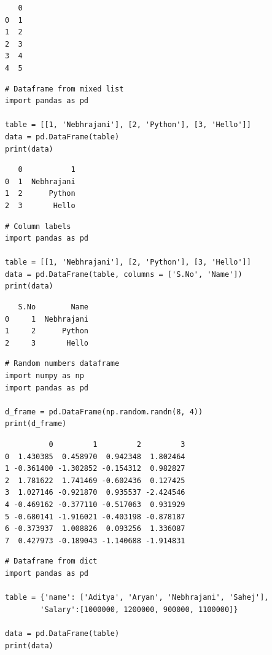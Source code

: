 \documentclass[11pt]{article}
\begin{document}
\begin{verbatim}
   0
0  1
1  2
2  3
3  4
4  5
\end{verbatim}


\begin{verbatim}
# Dataframe from mixed list
import pandas as pd

table = [[1, 'Nebhrajani'], [2, 'Python'], [3, 'Hello']]
data = pd.DataFrame(table)
print(data)
\end{verbatim}

\begin{verbatim}
   0           1
0  1  Nebhrajani
1  2      Python
2  3       Hello
\end{verbatim}


\begin{verbatim}
# Column labels
import pandas as pd

table = [[1, 'Nebhrajani'], [2, 'Python'], [3, 'Hello']]
data = pd.DataFrame(table, columns = ['S.No', 'Name'])
print(data)
\end{verbatim}

\begin{verbatim}
   S.No        Name
0     1  Nebhrajani
1     2      Python
2     3       Hello
\end{verbatim}


\begin{verbatim}
# Random numbers dataframe
import numpy as np
import pandas as pd

d_frame = pd.DataFrame(np.random.randn(8, 4))
print(d_frame)
\end{verbatim}

\begin{verbatim}
          0         1         2         3
0  1.430385  0.458970  0.942348  1.802464
1 -0.361400 -1.302852 -0.154312  0.982827
2  1.781622  1.741469 -0.602436  0.127425
3  1.027146 -0.921870  0.935537 -2.424546
4 -0.469162 -0.377110 -0.517063  0.931929
5 -0.680141 -1.916021 -0.403198 -0.878187
6 -0.373937  1.008826  0.093256  1.336087
7  0.427973 -0.189043 -1.140688 -1.914831
\end{verbatim}


\begin{verbatim}
# Dataframe from dict
import pandas as pd

table = {'name': ['Aditya', 'Aryan', 'Nebhrajani', 'Sahej'],
        'Salary':[1000000, 1200000, 900000, 1100000]}

data = pd.DataFrame(table)
print(data)
\end{verbatim}
\end{document}
